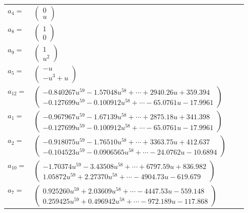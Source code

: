 \documentclass[1p]{elsarticle_modified}
\theoremstyle{definition}
\begin{document}
\begin{tabular}{m{7pt} m{180pt} m{7pt} m{180pt} }
\flushright $a_{4}=$&$\begin{pmatrix}0\\u\end{pmatrix}$ \\
\flushright $a_{8}=$&$\begin{pmatrix}1\\0\end{pmatrix}$ \\
\flushright $a_{9}=$&$\begin{pmatrix}1\\u^2\end{pmatrix}$ \\
\flushright $a_{5}=$&$\begin{pmatrix}- u\\- u^3+u\end{pmatrix}$ \\
\flushright $a_{12}=$&$\begin{pmatrix}-0.840267 u^{59}-1.57048 u^{58}+\cdots+2940.26 u+359.394\\-0.127699 u^{59}-0.100912 u^{58}+\cdots-65.0761 u-17.9961\end{pmatrix}$ \\
\flushright $a_{1}=$&$\begin{pmatrix}-0.967967 u^{59}-1.67139 u^{58}+\cdots+2875.18 u+341.398\\-0.127699 u^{59}-0.100912 u^{58}+\cdots-65.0761 u-17.9961\end{pmatrix}$ \\
\flushright $a_{2}=$&$\begin{pmatrix}-0.918075 u^{59}-1.76510 u^{58}+\cdots+3363.75 u+412.637\\-0.104523 u^{59}-0.0906565 u^{58}+\cdots-24.0762 u-10.6894\end{pmatrix}$ \\
\flushright $a_{10}=$&$\begin{pmatrix}-1.70374 u^{59}-3.43508 u^{58}+\cdots+6797.59 u+836.982\\1.05872 u^{59}+2.27370 u^{58}+\cdots-4904.73 u-619.679\end{pmatrix}$ \\
\flushright $a_{7}=$&$\begin{pmatrix}0.925260 u^{59}+2.03609 u^{58}+\cdots-4447.53 u-559.148\\0.259425 u^{59}+0.496942 u^{58}+\cdots-972.189 u-117.868\end{pmatrix}$ \\

\end{tabular}
\end{document}
